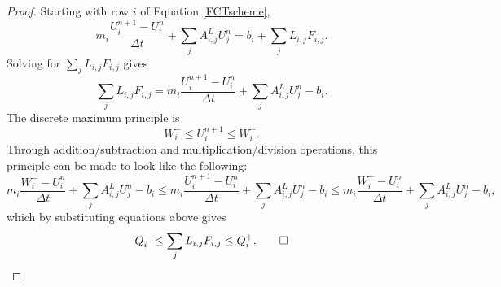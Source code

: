 \begin{proof}
   Starting with row $i$ of Equation \eqref{FCTscheme},
   \[
      m_i\frac{U_i^{n+1}-U_i^n}{\Delta t}
      + \sum\limits_j A_{i,j}^L U_j^n
      = b_i + \sum\limits_jL_{i,j}F_{i,j}.
   \]
   Solving for $\sum\limits_jL_{i,j}F_{i,j}$ gives
   \[
      \sum\limits_jL_{i,j}F_{i,j} =
      m_i\frac{U_i^{n+1}-U_i^n}{\Delta t}
      + \sum\limits_j A_{i,j}^L U_j^n
      - b_i.
   \]
   The discrete maximum principle is
   \[
      W_i^-\le U_i^{n+1}\le W_i^+.
   \]
   Through addition/subtraction and multiplication/division operations, this
   principle can be made to look like the following:
   \[
   m_i\frac{W_i^- -U_i^n}{\Delta t}
      + \sum\limits_j A_{i,j}^L U_j^n
      - b_i
   \le m_i\frac{U_i^{n+1}-U_i^n}{\Delta t}
      + \sum\limits_j A_{i,j}^L U_j^n
      - b_i
   \le m_i\frac{W_i^+ -U_i^n}{\Delta t}
      + \sum\limits_j A_{i,j}^L U_j^n
      - b_i,
   \]
   which by substituting equations above gives
   \[
      Q_i^-\le\sum\limits_j L_{i,j}F_{i,j}\le Q_i^+.\qed
   \]
\end{proof}
%
